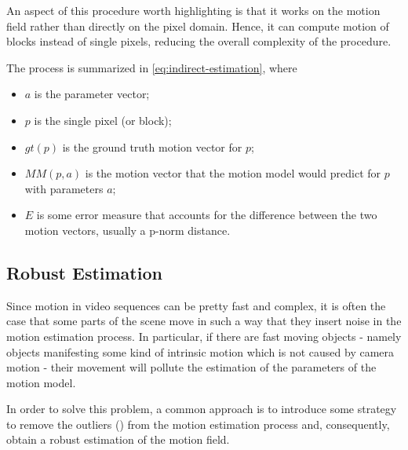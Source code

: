 An aspect of this procedure worth highlighting is that it works on the motion field rather than directly on the pixel domain. Hence, it can compute motion of blocks instead of single pixels, reducing the overall complexity of the procedure.

The process is summarized in \cref{eq:indirect-estimation}, where
\begin{itemize}
    \item $a$ is the parameter vector;
    \item $p$ is the single pixel (or block);
    \item $gt(p)$ is the ground truth motion vector for $p$;
    \item $MM(p,a)$ is the motion vector that the motion model would predict for $p$ with parameters $a$;
    \item $E$ is some error measure that accounts for the difference between the two motion vectors, usually a p-norm distance.
\end{itemize}



\subsection{Robust Estimation}
Since motion in video sequences can be pretty fast and complex, it is often the case that some parts of the scene move in such a way that they insert noise in the motion estimation process.
In particular, if there are fast moving objects - namely objects manifesting some kind of intrinsic motion which is not caused by camera motion - their movement will pollute the estimation of the parameters of the motion model.

In order to solve this problem, a common approach is to introduce some strategy to remove the outliers () from the motion estimation process and, consequently, obtain a robust estimation of the motion field.